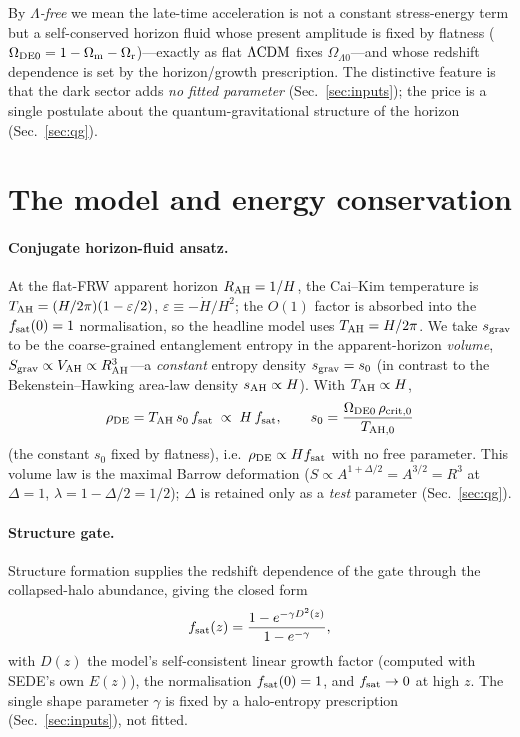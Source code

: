 By \emph{$\Lambda$-free} we mean the late-time acceleration is not a constant stress-energy term but a
self-conserved horizon fluid whose present amplitude is fixed by flatness
($\Omega_{\mathrm{DE0}}=1-\Omega_{\mathrm m}-\Omega_{\mathrm r}$)---exactly as flat $\Lambda\mathrm{CDM}$ fixes $\Omega_{\Lambda 0}$---and whose redshift
dependence is set by the horizon/growth prescription. The distinctive feature is that the dark sector
adds \emph{no fitted parameter} (Sec.~\ref{sec:inputs}); the price is a single postulate about the
quantum-gravitational structure of the horizon (Sec.~\ref{sec:qg}).

\section{The model and energy conservation}\label{sec:model}

\paragraph{Conjugate horizon-fluid ansatz.}
At the flat-FRW apparent horizon $R_{\mathrm{AH}}=1/H$, the Cai--Kim temperature is
$T_{\mathrm{AH}}=(H/2\pi)(1-\varepsilon/2)$, $\varepsilon\equiv-\dot H/H^2$; the $O(1)$ factor is absorbed into
the $f_{\mathrm{sat}}(0)=1$ normalisation, so the headline model uses $T_{\mathrm{AH}}=H/2\pi$. We take $s_{\mathrm{grav}}$ to be the
coarse-grained entanglement entropy in the apparent-horizon \emph{volume},
$S_{\rm grav}\propto V_{\mathrm{AH}}\propto R_{\mathrm{AH}}^3$---a \emph{constant} entropy density $s_{\mathrm{grav}}=s_0$ (in contrast to
the Bekenstein--Hawking area-law density $s_{\rm AH}\propto H$). With $T_{\mathrm{AH}}\propto H$,
\begin{equation}
\rho_{\mathrm{DE}}=T_{\mathrm{AH}}\,s_0\,f_{\mathrm{sat}}\;\propto\;H\,f_{\mathrm{sat}},\qquad
s_0=\frac{\Omega_{\mathrm{DE0}}\,\rho_{\rm crit,0}}{T_{\mathrm{AH},0}}
\label{eq:rhoH}
\end{equation}
(the constant $s_0$ fixed by flatness),
i.e.\ $\rho_{\mathrm{DE}}\propto Hf_{\mathrm{sat}}$ with no free parameter. This volume law is the maximal Barrow deformation
($S\propto A^{1+\Delta/2}=A^{3/2}=R^3$ at $\Delta=1$, $\lambda=1-\Delta/2=1/2$); $\Delta$ is retained
only as a \emph{test} parameter (Sec.~\ref{sec:qg}).

\paragraph{Structure gate.}
Structure formation supplies the redshift dependence of the gate through the collapsed-halo abundance,
giving the closed form
\begin{equation}
f_{\mathrm{sat}}(z)=\frac{1-e^{-\gamma D^2(z)}}{1-e^{-\gamma}},
\label{eq:fsat}
\end{equation}
with $D(z)$ the model's self-consistent linear growth factor (computed with SEDE's own $E(z)$), the
normalisation $f_{\mathrm{sat}}(0)=1$, and $f_{\mathrm{sat}}\to0$ at high $z$. The single shape parameter $\gamma$ is fixed
by a halo-entropy prescription (Sec.~\ref{sec:inputs}), not fitted.

